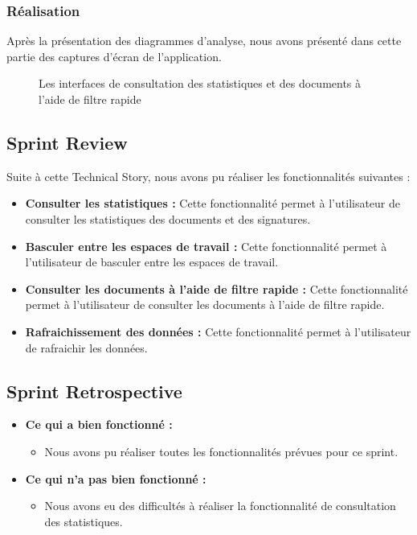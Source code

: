\subsubsection{Réalisation}

Après la présentation des diagrammes d'analyse, nous avons présenté dans cette partie des captures d'écran de l'application.

\begin{figure}[H]
  \centering
  \caption{Les interfaces de consultation des statistiques et des documents à l'aide de filtre rapide}
  \label{fig:realisation_sprint7}
\end{figure}

\subsection{Sprint Review}
Suite à cette Technical Story, nous avons pu réaliser les fonctionnalités suivantes :
\begin{itemize}
  \item \textbf{Consulter les statistiques :} Cette fonctionnalité permet à l'utilisateur de consulter les statistiques des documents et des signatures.
  \item \textbf{Basculer entre les espaces de travail :} Cette fonctionnalité permet à l'utilisateur de basculer entre les espaces de travail.
  \item \textbf{Consulter les documents à l'aide de filtre rapide :} Cette fonctionnalité permet à l'utilisateur de consulter les documents à l'aide de filtre rapide.
  \item \textbf{Rafraichissement des données :} Cette fonctionnalité permet à l'utilisateur de rafraichir les données.
\end{itemize}

\subsection{Sprint Retrospective}

\begin{itemize}
  \item \textbf{Ce qui a bien fonctionné :}
  \begin{itemize}
    \item Nous avons pu réaliser toutes les fonctionnalités prévues pour ce sprint.
  \end{itemize}

    \item \textbf{Ce qui n'a pas bien fonctionné :}
    \begin{itemize}
      \item Nous avons eu des difficultés à réaliser la fonctionnalité de consultation des statistiques.
    \end{itemize}
      
\end{itemize}
